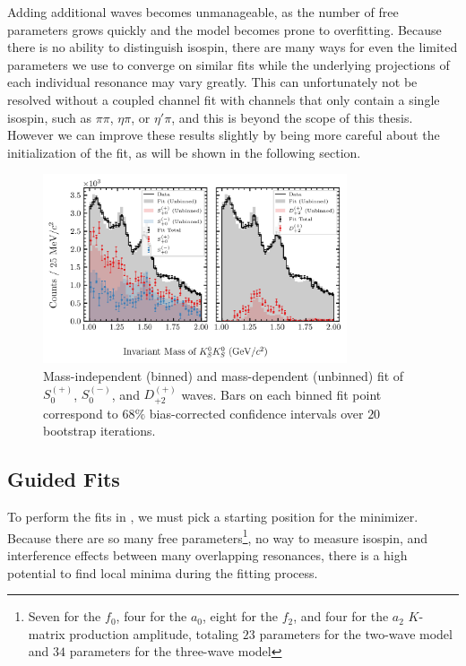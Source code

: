 Adding additional waves becomes unmanageable, as the number of free parameters grows quickly and the model becomes prone to overfitting. Because there is no ability to distinguish isospin, there are many ways for even the limited parameters we use to converge on similar fits while the underlying projections of each individual resonance may vary greatly. This can unfortunately not be resolved without a coupled channel fit with channels that only contain a single isospin, such as $\pi\pi$, $\eta\pi$, or $\eta'\pi$, and this is beyond the scope of this thesis. However we can improve these results slightly by being more careful about the initialization of the fit, as will be shown in the following section.

\begin{figure}
  \begin{center}
    \includegraphics[width=0.8\textwidth]{figures/binned_and_unbinned_fit_chisqdof_3.4_splot_D_1s_2b_phase_factor_waves29099_uncertainty_bootstrap-SE.png}
  \end{center}
  \caption{Mass-independent (binned) and mass-dependent (unbinned) fit of $S_{0}^{(+)}$, $S_{0}^{(-)}$, and $D_{+2}^{(+)}$ waves. Bars on each binned fit point correspond to $68\%$ bias-corrected confidence intervals over $20$ bootstrap iterations.}\label{fig:unbinned-fit-chisqdof-3.4-Spn-D2p}
\end{figure}

\subsection{Guided Fits}\label{sub:guided-fits}

To perform the fits in , we must pick a starting position for the minimizer. Because there are so many free parameters\footnote{Seven for the $f_0$, four for the $a_0$, eight for the $f_2$, and four for the $a_2$ $K$-matrix production amplitude, totaling $23$ parameters for the two-wave model and $34$ parameters for the three-wave model}, no way to measure isospin, and interference effects between many overlapping resonances, there is a high potential to find local minima during the fitting process.

